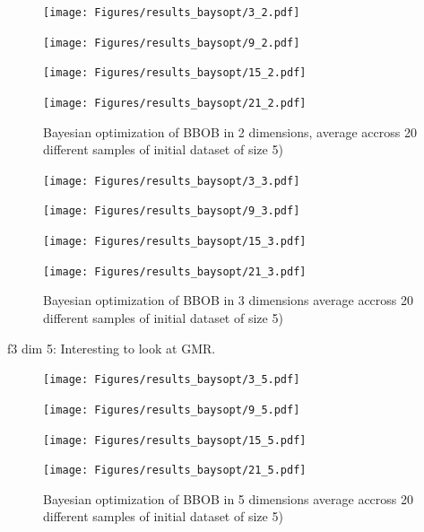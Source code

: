 \begin{figure}[H]
  \centering
  \begin{minipage}[b]{0.49\textwidth}
   \texttt{[image: Figures/results\_baysopt/3\_2.pdf]}
  \end{minipage}
  \hfill
  \begin{minipage}[b]{0.49\textwidth}
    \texttt{[image: Figures/results\_baysopt/9\_2.pdf]}
   \end{minipage}
   \begin{minipage}[b]{0.49\textwidth}
    \texttt{[image: Figures/results\_baysopt/15\_2.pdf]}
   \end{minipage}
   \hfill
   \begin{minipage}[b]{0.49\textwidth}
     \texttt{[image: Figures/results\_baysopt/21\_2.pdf]}
    \end{minipage}
  \caption{Bayesian optimization of BBOB in 2 dimensions, average accross 20 different samples of initial dataset of size 5)}
  \label{BBOB_bayesOpt}
\end{figure}


\begin{figure}[H]
  \centering
  \begin{minipage}[b]{0.49\textwidth}
   \texttt{[image: Figures/results\_baysopt/3\_3.pdf]}
  \end{minipage}
  \hfill
  \begin{minipage}[b]{0.49\textwidth}
    \texttt{[image: Figures/results\_baysopt/9\_3.pdf]}
   \end{minipage}
   \begin{minipage}[b]{0.49\textwidth}
    \texttt{[image: Figures/results\_baysopt/15\_3.pdf]}
   \end{minipage}
   \hfill
   \begin{minipage}[b]{0.49\textwidth}
     \texttt{[image: Figures/results\_baysopt/21\_3.pdf]}
    \end{minipage}
  \caption{Bayesian optimization of BBOB in 3 dimensions average accross 20 different samples of initial dataset of size 5)}
  \label{BBOB_bayesOpt}
\end{figure}

f3 dim 5: Interesting to look at GMR. 


\begin{figure}[H]
  \centering
  \begin{minipage}[b]{0.49\textwidth}
   \texttt{[image: Figures/results\_baysopt/3\_5.pdf]}
  \end{minipage}
  \hfill
  \begin{minipage}[b]{0.49\textwidth}
    \texttt{[image: Figures/results\_baysopt/9\_5.pdf]}
   \end{minipage}
   \begin{minipage}[b]{0.49\textwidth}
    \texttt{[image: Figures/results\_baysopt/15\_5.pdf]}
   \end{minipage}
   \hfill
   \begin{minipage}[b]{0.49\textwidth}
     \texttt{[image: Figures/results\_baysopt/21\_5.pdf]}
    \end{minipage}
  \caption{Bayesian optimization of BBOB in 5 dimensions average accross 20 different samples of initial dataset of size 5)}
  \label{BBOB_bayesOpt5}
\end{figure}